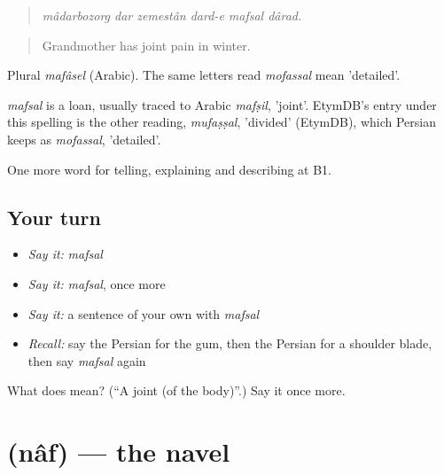 \begin{quote}
\emph{mâdarbozorg dar zemestân dard-e mafsal dârad.}
\end{quote}

\begin{quote}
Grandmother has joint pain in winter.
\end{quote}

Plural \emph{mafâsel} (Arabic). The same letters read \emph{mofassal} mean 'detailed'.

\begin{cousinweb}
\emph{mafsal} is a loan, usually traced to Arabic \emph{mafṣil}, 'joint'. EtymDB's entry under this spelling is the other reading, \emph{mufaṣṣal}, 'divided' (EtymDB), which Persian keeps as \emph{mofassal}, 'detailed'.
\end{cousinweb}

\begin{grammarlens}[title={What you've built}]
One more word for telling, explaining and describing at B1.
\end{grammarlens}

\subsection*{Your turn}
\begin{itemize}
\raggedright
  \item \emph{Say it:} \emph{mafsal}
  \item \emph{Say it:} \emph{mafsal}, once more
  \item \emph{Say it:} a sentence of your own with \emph{mafsal}
  \item \emph{Recall:} say the Persian for the gum, then the Persian for a shoulder blade, then say \emph{mafsal} again
\end{itemize}

\begin{tcolorbox}[breakable,colback=teal!4,colframe=teal!35!black,title={Before you move on}]
What does  mean? (\textquotedblleft{}A joint (of the body)\textquotedblright{}.) Say it once more.
\end{tcolorbox}
\section[\texorpdfstring{\fa{ناف} (nâf)}{ناف (nâf)}]{ (nâf) — the navel}

\label{lesson:FA-C497-naf}




